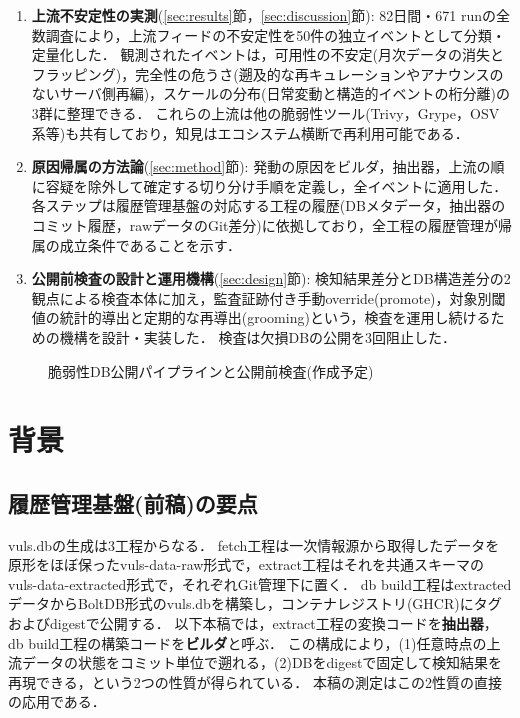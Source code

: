 \documentclass{css}
\begin{document}
\begin{enumerate}
\item \textbf{上流不安定性の実測}(\ref{sec:results}節，\ref{sec:discussion}節):
82日間・671 runの全数調査により，上流フィードの不安定性を50件の独立イベントとして分類・定量化した．
観測されたイベントは，可用性の不安定(月次データの消失とフラッピング)，完全性の危うさ(遡及的な再キュレーションやアナウンスのないサーバ側再編)，スケールの分布(日常変動と構造的イベントの桁分離)の3群に整理できる．
これらの上流は他の脆弱性ツール(Trivy，Grype，OSV系等)も共有しており，知見はエコシステム横断で再利用可能である．
\item \textbf{原因帰属の方法論}(\ref{sec:method}節):
発動の原因をビルダ，抽出器，上流の順に容疑を除外して確定する切り分け手順を定義し，全イベントに適用した．
各ステップは履歴管理基盤\cite{nakaoka2025}の対応する工程の履歴(DBメタデータ，抽出器のコミット履歴，rawデータのGit差分)に依拠しており，全工程の履歴管理が帰属の成立条件であることを示す．
\item \textbf{公開前検査の設計と運用機構}(\ref{sec:design}節):
検知結果差分とDB構造差分の2観点による検査本体に加え，監査証跡付き手動override(promote)，対象別閾値の統計的導出と定期的な再導出(grooming)という，検査を運用し続けるための機構を設計・実装した．
検査は欠損DBの公開を3回阻止した．
\end{enumerate}

\begin{figure}[tb]
\centering
{}
\caption{脆弱性DB公開パイプラインと公開前検査(作成予定)}
\label{fig:arch}
\end{figure}

\section{背景}
\label{sec:background}

\subsection{履歴管理基盤(前稿)の要点}
\label{sec:infra}

vuls.dbの生成は3工程からなる\cite{nakaoka2025,vuls-data-update,vuls-data-db}．
fetch工程は一次情報源から取得したデータを原形をほぼ保ったvuls-data-raw形式で，extract工程はそれを共通スキーマのvuls-data-extracted形式で，それぞれGit管理下に置く．
db build工程はextractedデータからBoltDB形式のvuls.dbを構築し，コンテナレジストリ(GHCR)にタグおよびdigestで公開する．
以下本稿では，extract工程の変換コードを\textbf{抽出器}，db build工程の構築コードを\textbf{ビルダ}と呼ぶ．
この構成により，(1)任意時点の上流データの状態をコミット単位で遡れる，(2)DBをdigestで固定して検知結果を再現できる，という2つの性質が得られている．
本稿の測定はこの2性質の直接の応用である．
\end{document}
